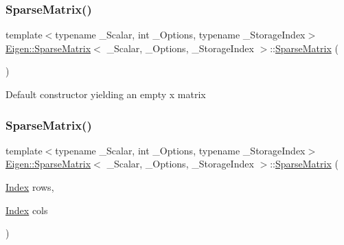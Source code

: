 \subsubsection{\texorpdfstring{SparseMatrix()}{SparseMatrix()}\hspace{0.1cm}{\footnotesize\ttfamily [1/5]}}
{\footnotesize\ttfamily template$<$typename \+\_\+\+Scalar, int \+\_\+\+Options, typename \+\_\+\+Storage\+Index$>$ \\
\mbox{\hyperlink{class_eigen_1_1_sparse_matrix}{Eigen\+::\+Sparse\+Matrix}}$<$ \+\_\+\+Scalar, \+\_\+\+Options, \+\_\+\+Storage\+Index $>$\+::\mbox{\hyperlink{class_eigen_1_1_sparse_matrix}{Sparse\+Matrix}} (\begin{DoxyParamCaption}{ }\end{DoxyParamCaption})\hspace{0.3cm}{\ttfamily [inline]}}

Default constructor yielding an empty {} {\ttfamily x} {} matrix \mbox{\label{class_eigen_1_1_sparse_matrix_a6abf1015a0243be97648e106a17b01ea}} 
\subsubsection{\texorpdfstring{SparseMatrix()}{SparseMatrix()}\hspace{0.1cm}{\footnotesize\ttfamily [2/5]}}
{\footnotesize\ttfamily template$<$typename \+\_\+\+Scalar, int \+\_\+\+Options, typename \+\_\+\+Storage\+Index$>$ \\
\mbox{\hyperlink{class_eigen_1_1_sparse_matrix}{Eigen\+::\+Sparse\+Matrix}}$<$ \+\_\+\+Scalar, \+\_\+\+Options, \+\_\+\+Storage\+Index $>$\+::\mbox{\hyperlink{class_eigen_1_1_sparse_matrix}{Sparse\+Matrix}} (\begin{DoxyParamCaption}\item[{\mbox{\hyperlink{struct_eigen_1_1_eigen_base_a554f30542cc2316add4b1ea0a492ff02}{Index}}}]{rows,  }\item[{\mbox{\hyperlink{struct_eigen_1_1_eigen_base_a554f30542cc2316add4b1ea0a492ff02}{Index}}}]{cols }\end{DoxyParamCaption})\hspace{0.3cm}{\ttfamily [inline]}}

